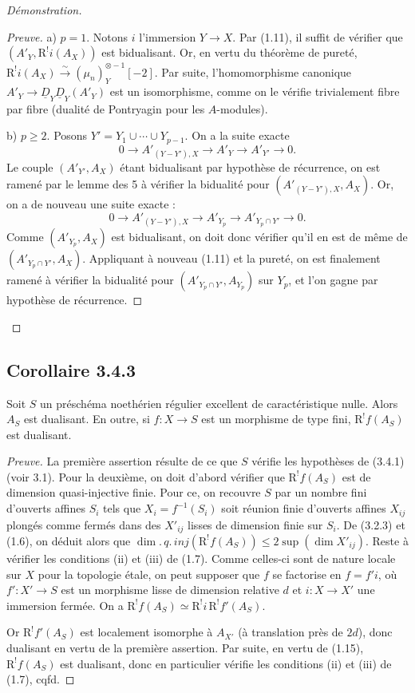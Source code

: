 \documentclass[11pt]{article}
\newcommand{\R}{\mathrm{R}}\newcommand{\RHomCore}{\mathrm{RHom}}
\providecommand{\R}{\mathrm R}
\begin{document}
\begin{proof}[Démonstration]
\begin{proof}[Preuve]
a) $p = 1$. Notons $i$ l'immersion $Y \to X$. Par (1.11), il suffit de vérifier que $(A'_Y, \R^{!}i(A_X))$ est bidualisant. Or, en vertu du théorème de pureté, $\R^{!}i(A_X) \xrightarrow{\sim} (\mu_n)^{\otimes -1}_Y[-2]$. Par suite, l'homomorphisme canonique $A'_Y \to \underline{D}_Y \underline{D}_Y(A'_Y)$ est un isomorphisme, comme on le vérifie trivialement fibre par fibre (dualité de Pontryagin pour les $A$-modules).

b) $p \geqslant 2$. Posons $Y' = Y_1 \cup \cdots \cup Y_{p-1}$. On a la suite exacte
\[
0 \longrightarrow A'_{(Y-Y'),X} \longrightarrow A'_Y \longrightarrow A'_{Y'} \longrightarrow 0.
\]
Le couple $(A'_{Y'}, A_X)$ étant bidualisant par hypothèse de récurrence, on est ramené par le lemme des 5 à vérifier la bidualité pour $(A'_{(Y-Y'),X}, A_X)$. Or, on a de nouveau une suite exacte :
\[
0 \longrightarrow A'_{(Y-Y'),X} \longrightarrow A'_{Y_p} \longrightarrow A'_{Y_p \cap Y'} \longrightarrow 0.
\]
Comme $(A'_{Y_p}, A_X)$ est bidualisant, on doit donc vérifier qu'il en est de même de $(A'_{Y_p \cap Y'}, A_X)$. Appliquant à nouveau (1.11) et la pureté, on est finalement ramené à vérifier la bidualité pour $(A'_{Y_p \cap Y'}, A_{Y_p})$ sur $Y_p$, et l'on gagne par hypothèse de récurrence.
\end{proof}
\end{proof}

\subsection*{Corollaire 3.4.3}
Soit $S$ un préschéma noethérien régulier excellent de caractéristique nulle. Alors $A_S$ est dualisant. En outre, si $f : X \to S$ est un morphisme de type fini, $\R^{!}f(A_S)$ est dualisant.

\begin{proof}[Preuve]
La première assertion résulte de ce que $S$ vérifie les hypothèses de (3.4.1) (voir 3.1). Pour la deuxième, on doit d'abord vérifier que $\R^{!}f(A_S)$ est de dimension quasi-injective finie. Pour ce, on recouvre $S$ par un nombre fini d'ouverts affines $S_i$ tels que $X_i = f^{-1}(S_i)$ soit réunion finie d'ouverts affines $X_{ij}$ plongés comme fermés dans des $X'_{ij}$ lisses de dimension finie sur $S_i$. De (3.2.3) et (1.6), on déduit alors que $\dim.\,q.\,inj(\R^{!}f(A_S)) \leqslant 2\sup(\dim X'_{ij})$. Reste à vérifier les conditions (ii) et (iii) de (1.7). Comme celles-ci sont de nature locale sur $X$ pour la topologie étale, on peut supposer que $f$ se factorise en $f = f'i$, où $f' : X' \to S$ est un morphisme lisse de dimension relative $d$ et $i : X \to X'$ une immersion fermée. On a $\R^{!}f(A_S) \simeq \R^{!}i \, \R^{!}f'(A_S)$.

Or $\R^{!}f'(A_S)$ est localement isomorphe à $A_{X'}$ (à translation près de $2d$), donc dualisant en vertu de la première assertion. Par suite, en vertu de (1.15), $\R^{!}f(A_S)$ est dualisant, donc en particulier vérifie les conditions (ii) et (iii) de (1.7), cqfd.
\end{proof}
\end{document}

